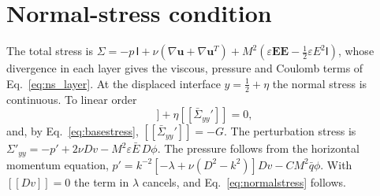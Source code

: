 \documentclass[aip,pof,reprint,amsmath,amssymb]{revtex4-2}
\newcommand{\bu}{\bm{u}}
\newcommand{\bE}{\bm{E}}
\newcommand{\jump}[1]{[\![#1]\!]}
\begin{document}
\appendix

\section{Normal-stress condition}\label{app:normal}

The total stress is $\Sigma=-p\,\mathsf I+\nu(\nabla\bu+\nabla\bu^{T})+M^2(\varepsilon\bE\bE-
\tfrac12\varepsilon E^2\mathsf I)$, whose divergence in each layer gives the viscous,
pressure and Coulomb terms of Eq.~\eqref{eq:ns_layer}. At the displaced interface
$y=\tfrac12+\eta$ the normal stress is continuous. To linear order
\begin{equation}
\jump{\Sigma'_{yy}}+\eta\jump{\bar\Sigma_{yy}'}=0,
\end{equation}
and, by Eq.~\eqref{eq:basestress}, $\jump{\bar\Sigma_{yy}'}=-G$. The perturbation stress is
$\Sigma'_{yy}=-p'+2\nu Dv-M^2\varepsilon\bar E\,D\phi$. The pressure follows from the
horizontal momentum equation, $p'=k^{-2}[-\lambda+\nu(D^2-k^2)]Dv-CM^2\bar q\phi$. With
$\jump{Dv}=0$ the term in $\lambda$ cancels, and Eq.~\eqref{eq:normalstress} follows.


\end{document}
